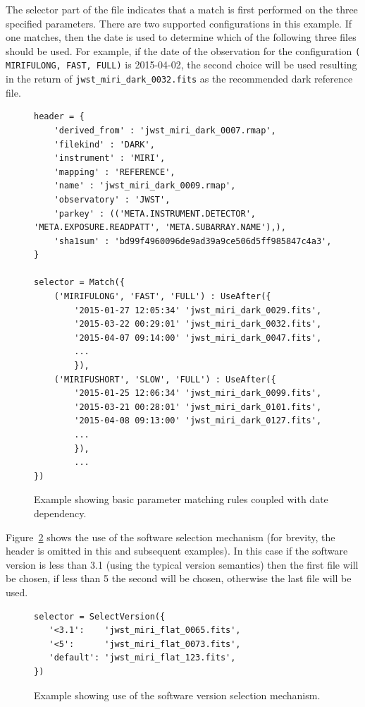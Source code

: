 \documentclass[final,authoryear,5p,times,twocolumn]{elsarticle}
\begin{document}
The selector part of the file indicates that a match is first performed on the 
three specified parameters. There are two supported configurations in this example.
If one matches, then the date is used to determine which of the following three files
should be used.
For example, if the date of the observation for the configuration {\tt (\textquotesingle 
MIRIFULONG\textquotesingle , \textquotesingle FAST\textquotesingle , 
\textquotesingle FULL\textquotesingle )} is 2015-04-02, the second choice 
will be used resulting in the return of {\tt jwst\_miri\_dark\_0032.fits} 
as the recommended dark reference file.


\begin{figure}
\begin{mdframed}
\begin{verbatim}
header = {
    'derived_from' : 'jwst_miri_dark_0007.rmap',
    'filekind' : 'DARK',
    'instrument' : 'MIRI',
    'mapping' : 'REFERENCE',
    'name' : 'jwst_miri_dark_0009.rmap',
    'observatory' : 'JWST',
    'parkey' : (('META.INSTRUMENT.DETECTOR', 'META.EXPOSURE.READPATT', 'META.SUBARRAY.NAME'),),
    'sha1sum' : 'bd99f4960096de9ad39a9ce506d5ff985847c4a3',
}

selector = Match({
    ('MIRIFULONG', 'FAST', 'FULL') : UseAfter({
        '2015-01-27 12:05:34' 'jwst_miri_dark_0029.fits',
        '2015-03-22 00:29:01' 'jwst_miri_dark_0032.fits',
        '2015-04-07 09:14:00' 'jwst_miri_dark_0047.fits',
        ...
        }),
    ('MIRIFUSHORT', 'SLOW', 'FULL') : UseAfter({
        '2015-01-25 12:06:34' 'jwst_miri_dark_0099.fits',
        '2015-03-21 00:28:01' 'jwst_miri_dark_0101.fits',
        '2015-04-08 09:13:00' 'jwst_miri_dark_0127.fits',
        ...
        }),
        ...
})
\end{verbatim}
\end{mdframed}
\caption{Example showing basic parameter matching rules coupled with date dependency.}
\label{fig:example1}
\end{figure}

Figure~\ref{fig:example2} shows the use of the software selection mechanism (for brevity, the header is omitted in this and subsequent examples). In this case if the software version is less than 3.1 (using the typical version semantics) then the first file will be chosen, if less than 5 the second will be chosen, otherwise the last file will be used.

\newpage

\begin{figure}
\begin{mdframed}
\begin{verbatim}
selector = SelectVersion({
   '<3.1':    'jwst_miri_flat_0065.fits',
   '<5':      'jwst_miri_flat_0073.fits',
   'default': 'jwst_miri_flat_123.fits',
})
\end{verbatim}
\end{mdframed}
\caption{Example showing use of the software version selection mechanism.}
\label{fig:example2}
\end{figure}
\end{document}
